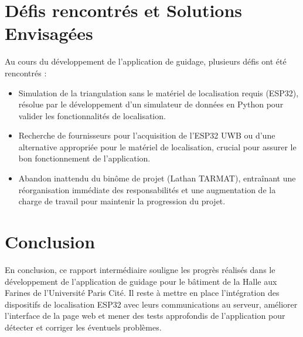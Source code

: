 \documentclass{article}
\begin{document}
\section{Défis rencontrés et Solutions Envisagées}

Au cours du développement de l'application de guidage, plusieurs défis ont été rencontrés :

\begin{itemize}
    \item Simulation de la triangulation sans le matériel de localisation requis (ESP32), résolue par le développement d'un simulateur de données en Python pour valider les fonctionnalités de localisation.
    
    \item Recherche de fournisseurs pour l'acquisition de l'ESP32 UWB ou d'une alternative appropriée pour le matériel de localisation, crucial pour assurer le bon fonctionnement de l'application.
    
    \item Abandon inattendu du binôme de projet (Lathan TARMAT), entraînant une réorganisation immédiate des responsabilités et une augmentation de la charge de travail pour maintenir la progression du projet.
\end{itemize}


\section{Conclusion}

En conclusion, ce rapport intermédiaire souligne les progrès réalisés dans le développement de l'application de guidage pour le bâtiment de la Halle aux Farines de l'Université Paris Cité. Il reste à mettre en place l'intégration des dispositifs de localisation ESP32 avec leurs communications au serveur, améliorer l’interface de la page web et mener des tests approfondis de l'application pour détecter et corriger les éventuels problèmes.
\end{document}
